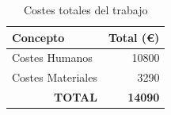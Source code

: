 \begin{table}[h]
\caption{Costes totales del trabajo}
\label{tab:costes_totales}
\centering
\begin{tabular}{l|r}
\toprule
\textbf{Concepto}                   & \multicolumn{1}{l}{\textbf{Total (€)}} \\ \hline
Costes Humanos                      & 10800                                   \\
Costes Materiales                   & 3290                                   \\ \hline
\multicolumn{1}{r|}{\textbf{TOTAL}} & \textbf{14090}  \\
\bottomrule
\end{tabular}
\end{table}